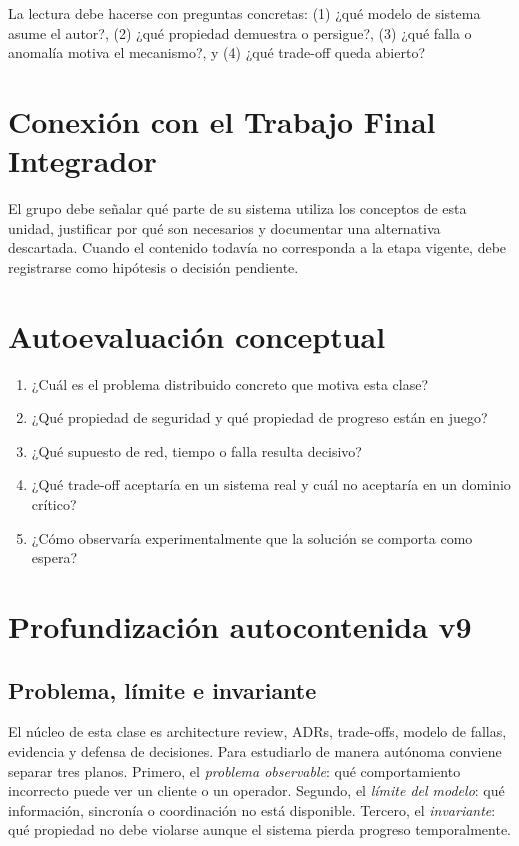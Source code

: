 \documentclass[variant=apuntes,cover=institutional,mode=screen]{ua-engineering-v6-article}
\begin{document}
La lectura debe hacerse con preguntas concretas: (1) ¿qué modelo de sistema asume el autor?, (2) ¿qué propiedad demuestra o persigue?, (3) ¿qué falla o anomalía motiva el mecanismo?, y (4) ¿qué trade-off queda abierto?

\section{Conexión con el Trabajo Final Integrador}
El grupo debe señalar qué parte de su sistema utiliza los conceptos de esta unidad, justificar por qué son necesarios y documentar una alternativa descartada. Cuando el contenido todavía no corresponda a la etapa vigente, debe registrarse como hipótesis o decisión pendiente.

\section{Autoevaluación conceptual}
\begin{enumerate}
\item ¿Cuál es el problema distribuido concreto que motiva esta clase?
\item ¿Qué propiedad de seguridad y qué propiedad de progreso están en juego?
\item ¿Qué supuesto de red, tiempo o falla resulta decisivo?
\item ¿Qué trade-off aceptaría en un sistema real y cuál no aceptaría en un dominio crítico?
\item ¿Cómo observaría experimentalmente que la solución se comporta como espera?
\end{enumerate}

\section{Profundización autocontenida v9}
\subsection{Problema, límite e invariante}
El núcleo de esta clase es architecture review, ADRs, trade-offs, modelo de fallas, evidencia y defensa de decisiones. Para estudiarlo de manera autónoma conviene separar tres planos. Primero, el \emph{problema observable}: qué comportamiento incorrecto puede ver un cliente o un operador. Segundo, el \emph{límite del modelo}: qué información, sincronía o coordinación no está disponible. Tercero, el \emph{invariante}: qué propiedad no debe violarse aunque el sistema pierda progreso temporalmente.
\end{document}
